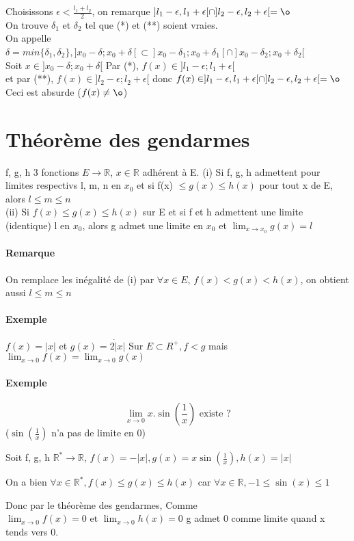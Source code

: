 Choisissons $\epsilon < \frac{l_1+l_2}{2}$, on remarque $]l_1 - \epsilon, l_1 + \epsilon[ \cap ]l_2 - \epsilon, l_2 + \epsilon[ = \o$
~\\
	On trouve $\delta_1$ et $\delta_2$ tel que (*) et (**) soient vraies.
~\\
On appelle $\delta = min\{\delta_1, \delta_2\}, ]x_0-\delta; x_0+\delta[ \subset ]x_0 - \delta_1; x_0+\delta_1[ \cap ]x_0-\delta_2;x_0+\delta_2[$
~\\

Soit $x \in ]x_0-\delta; x_0+\delta[$ Par (*), $f(x) \in ]l_1-\epsilon; l_1+\epsilon[$
~\\
et par (**), $f(x) \in ]l_2-\epsilon; l_2+\epsilon[$ donc $f(x) \in ]l_1 - \epsilon, l_1 + \epsilon[ \cap ]l_2 - \epsilon, l_2 + \epsilon[ = \o $ Ceci est absurde ($f(x) \neq \o$)
~\\

\section{Théorème des gendarmes}
f, g, h 3 fonctions $E \rightarrow \mathbb{R}$, $x\in \mathbb{R}$ adhérent à E. \newline
(i) Si f, g, h admettent pour limites respectivs l, m, n en $x_0$ et si f(x) $\leq g(x) \leq h(x)$ pour tout x de E, alors $l \leq m \leq n$
~\\
(ii) Si $f(x) \leq g(x) \leq h(x)$ sur E et si f et h admettent une limite (identique) l en $x_0$, alors g admet une limite en $x_0$ et $\lim_{x \to x_0} g(x) = l$

\paragraph{Remarque} On remplace les inégalité de (i) par $\forall x \in E$, $f(x) < g(x) < h(x)$, on obtient aussi $l \leq m \leq n$

\paragraph{Exemple} $f(x) = |x|$ et $g(x) = 2\dot |x|$ Sur $E \subset R^+, f<g$ mais $\lim_{x \to 0}f(x) = \lim_{x \to 0} g(x)$

\paragraph{Exemple} \[\lim_{x \to 0} x .\sin(\frac{1}{x}) \text{ existe ?}\]
($\sin(\frac{1}{x})$ n'a pas de limite en 0)

Soit f, g, h $\mathbb{R}^* \rightarrow \mathbb{R}$, $f(x) = -|x|, g(x) = x \sin(\frac{1}{x}), h(x) = |x|$

On a bien $\forall x \in \mathbb{R}^*, f(x) \leq g(x) \leq h(x)$ car $\forall x \in \mathbb{R}, -1 \leq \sin(x) \leq 1$

Donc par le théorème des gendarmes, Comme $\lim_{x \to 0} f(x) = 0 \text{ et } \lim_{x \to 0} h(x) = 0$ g admet 0 comme limite quand x tends vers 0.
